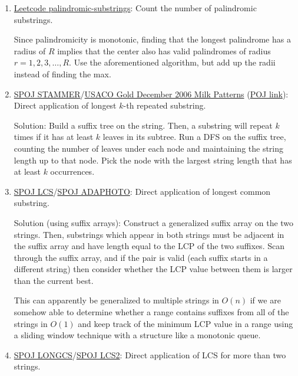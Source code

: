 \documentclass[11pt, oneside]{article}
\begin{document}
\begin{enumerate}
  \item \href{https://leetcode.com/problems/palindromic-substrings/}{Leetcode palindromic-substrings}: Count the number of palindromic substrings.

  Since palindromicity is monotonic, finding that the longest palindrome has a radius of
  \( R \) implies that the center also has valid palindromes of radius \( r = 1, 2, 3, \dots, R \).
  Use the aforementioned algorithm, but add up the radii instead of finding the max.

  \item \href{https://www.spoj.com/problems/STAMMER/}{SPOJ STAMMER}/\href{https://contest.usaco.org/DEC06.htm}{USACO Gold December 2006 Milk Patterns} (\href{http://poj.org/problem?id=3261}{POJ link}): \\ Direct application of longest \( k \)-th repeated substring.

  Solution: Build a suffix tree on the string. Then, a substring will repeat \( k \) times
  if it has at least \( k \) leaves in its subtree. Run a DFS on the suffix tree, counting
  the number of leaves under each node and maintaining the string length up to that node.
  Pick the node with the largest string length that has at least \( k \) occurrences.

  \item \href{https://www.spoj.com/problems/LCS/}{SPOJ LCS}/\href{http://www.spoj.com/problems/ADAPHOTO/}{SPOJ ADAPHOTO}:
  Direct application of longest common substring.

  Solution (using suffix arrays): Construct a generalized suffix array on the two strings.
  Then, substrings which appear in both strings must be adjacent in the suffix array and
  have length equal to the LCP of the two suffixes.
  Scan through the suffix array, and if the pair is valid (each suffix starts in a different string)
  then consider whether the LCP value between them is larger than the current best.

  This can apparently be generalized to multiple strings in \( O(n) \)
  if we are somehow able to determine whether a range contains suffixes from all of the strings in \( O(1) \)
  and keep track of the minimum LCP value in a range using a sliding window technique with a structure like a monotonic queue.

  \item \href{https://www.spoj.com/problems/LONGCS/}{SPOJ LONGCS}/\href{http://www.spoj.com/problems/LCS2/}{SPOJ LCS2}:
  Direct application of LCS for more than two strings.


\end{enumerate}
\end{document}
